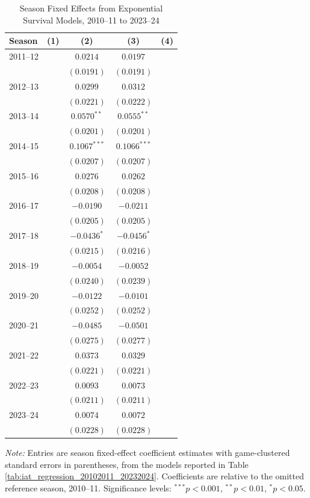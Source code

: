 \begin{table}[htbp]
\centering
\caption{Season Fixed Effects from Exponential Survival Models, 2010--11 to 2023--24}
\label{tab:season_control_results_20102011_20232024}
\scriptsize
\renewcommand{\arraystretch}{1.12}
\setlength{\tabcolsep}{6pt}

\begin{tabular*}{0.85\textwidth}{@{\extracolsep{\fill}}lcccc}
\toprule
Season & (1) & (2) & (3) & (4) \\
\midrule
2011--12 &  & $0.0214$ & $0.0197$ &  \\
 &  & $(0.0191)$ & $(0.0191)$ &  \\
2012--13 &  & $0.0299$ & $0.0312$ &  \\
 &  & $(0.0221)$ & $(0.0222)$ &  \\
2013--14 &  & $0.0570^{**}$ & $0.0555^{**}$ &  \\
 &  & $(0.0201)$ & $(0.0201)$ &  \\
2014--15 &  & $0.1067^{***}$ & $0.1066^{***}$ &  \\
 &  & $(0.0207)$ & $(0.0207)$ &  \\
2015--16 &  & $0.0276$ & $0.0262$ &  \\
 &  & $(0.0208)$ & $(0.0208)$ &  \\
2016--17 &  & $-0.0190$ & $-0.0211$ &  \\
 &  & $(0.0205)$ & $(0.0205)$ &  \\
2017--18 &  & $-0.0436^{*}$ & $-0.0456^{*}$ &  \\
 &  & $(0.0215)$ & $(0.0216)$ &  \\
2018--19 &  & $-0.0054$ & $-0.0052$ &  \\
 &  & $(0.0240)$ & $(0.0239)$ &  \\
2019--20 &  & $-0.0122$ & $-0.0101$ &  \\
 &  & $(0.0252)$ & $(0.0252)$ &  \\
2020--21 &  & $-0.0485$ & $-0.0501$ &  \\
 &  & $(0.0275)$ & $(0.0277)$ &  \\
2021--22 &  & $0.0373$ & $0.0329$ &  \\
 &  & $(0.0221)$ & $(0.0221)$ &  \\
2022--23 &  & $0.0093$ & $0.0073$ &  \\
 &  & $(0.0211)$ & $(0.0211)$ &  \\
2023--24 &  & $0.0074$ & $0.0072$ &  \\
 &  & $(0.0228)$ & $(0.0228)$ &  \\
\bottomrule
\end{tabular*}

\vspace{0.4em}
\parbox{0.85\textwidth}{
\footnotesize
\textit{Note:} Entries are season fixed-effect coefficient estimates with game-clustered standard errors in parentheses, from the models reported in Table \ref{tab:iat_regression_20102011_20232024}. Coefficients are relative to the omitted reference season, 2010--11. Significance levels: $^{***}p<0.001$, $^{**}p<0.01$, $^{*}p<0.05$.
}
\end{table}
